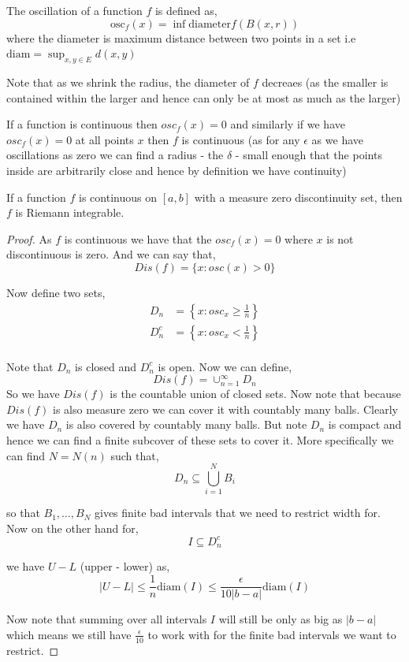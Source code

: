\begin{definition}
    The oscillation of a function $f$ is defined as, 
    \[
        \text{osc}_f(x) = \inf \text{diameter}f(B(x, r))
    \]
    where the diameter is maximum distance between two points in a set i.e $\text{diam} = \sup_{x,y \in E} d(x, y)$ 
\end{definition}
\begin{note}
    Note that as we shrink the radius, the diameter of $f$ decreaes (as the smaller is contained within the larger and hence can only be at most as much as the larger)
\end{note}
\begin{remark}
    If a function is continuous then $osc_f(x) = 0$ and similarly if we have $osc_f(x) = 0$ at all points $x$ then $f$ is continuous (as for any $\epsilon$ as we have oscillations as zero we can find a radius - the $\delta$ - small enough that the points inside are arbitrarily close and hence by definition we have continuity)
\end{remark}
\begin{theorem}
    If a function $f$ is continuous on $[a, b]$ with a measure zero discontinuity set, then $f$ is Riemann integrable.
\end{theorem}
\begin{proof}
    As $f$ is continuous we have that the $osc_f(x) = 0$  where $x$ is not discontinuous is zero. And we can say that, 
    \[
        Dis(f) = \{x: osc(x) > 0\}
    \]

    Now define two sets, 
    \begin{align*}
        D_n &= \left \{x : osc_x \ge \frac{1}{n} \right \}\\
        D_n^{c} &= \left \{ x : osc_x < \frac{1}{n}\right\}\\
    \end{align*}

    Note that $D_n$ is closed and $D_n^{c}$ is open. Now we can define, 
    \[
        Dis(f) = \cup_{n = 1}^{\infty} D_n
    \]
    So we have $Dis(f)$ is the countable union of closed sets. Now note that because $Dis(f)$ is also measure zero we can cover it with countably many balls. Clearly we have $D_n$ is also covered by countably many balls. But note $D_n$ is compact and hence we can find a finite subcover of these sets to cover it. More specifically we can find $N = N(n)$ such that,
    \[
        D_n \subseteq  \bigcup_{i = 1}^{N} B_i
    \]

    so that $B_{1}, \dots, B_N$ gives finite bad intervals that we need to restrict width for. Now on the other hand for, 
    \[
        I \subseteq D_n^{c}
    \]

    we have $U - L$ (upper - lower) as, 
    \[
        |U - L| \le \frac{1}{n} \text{diam}(I) \le \frac{\epsilon}{10|b - a| } \text{diam}(I)
    \]

    Now note that summing over all intervals $I$ will still be only as big as $|b - a|$ which means we still have $\frac{\epsilon}{10}$ to work with for the finite bad intervals we want to restrict.
\end{proof}


